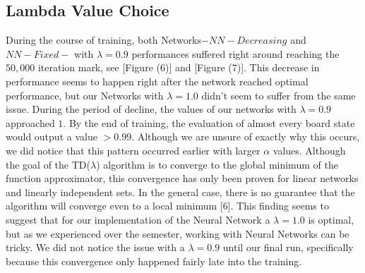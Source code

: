 \documentclass{sig-alternate-05-2015}
\begin{document}
\subsection{Lambda Value Choice}
During the course of training, both Networks$-NN-Decreasing$ and $NN-Fixed-$ with $\lambda = 0.9$ performances suffered right around reaching the $50,000$ iteration mark, see [Figure (6)] and [Figure (7)]. This decrease in performance seems to happen right after the network reached optimal performance, but our Networks with  $\lambda = 1.0$   didn't seem to suffer from the same issue. During the period of decline, the values of our networks with $\lambda = 0.9$ approached $1$. By the end of training, the evaluation of almost every board state would output a value $> 0.99$. Although we are unsure of exactly why this occurs, we did notice that this pattern occurred earlier with larger $\alpha$ values. Although the goal of the TD($\lambda$) algorithm is to converge to the global minimum of the function approximator, this convergence has only been proven for linear networks and linearly independent sets. In the general case, there is no guarantee that the algorithm will converge even to a local minimum [6]. This finding seems to suggest that for our implementation of the Neural Network a $\lambda = 1.0$ is optimal, but as we experienced over the semester, working with Neural Networks can be tricky. We did not notice the issue with a $\lambda = 0.9$ until our final run, specifically because this convergence only happened fairly late into the training.
\end{document}
